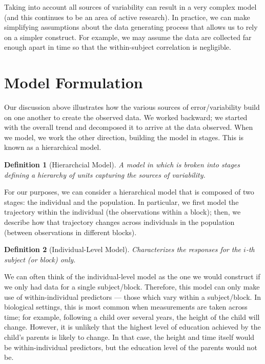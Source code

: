 \documentclass[
]{book}
\theoremstyle{plain}
\theoremstyle{mydefn}
\newtheorem{definition}{Definition}[chapter]
\theoremstyle{myexmpl}
\theoremstyle{remark}
\begin{document}
Taking into account all sources of variability can result in a very complex model (and this continues to be an area of active research). In practice, we can make simplifying assumptions about the data generating process that allows us to rely on a simpler construct. For example, we may assume the data are collected far enough apart in time so that the within-subject correlation is negligible.

\hypertarget{model-formulation}{%
\section{Model Formulation}\label{model-formulation}}

Our discussion above illustrates how the various sources of error/variability build on one another to create the observed data. We worked backward; we started with the overall trend and decomposed it to arrive at the data observed. When we model, we work the other direction, building the model in stages. This is known as a hierarchical model.

\begin{definition}[Hierarchcial Model]
A model in which is broken into stages defining a hierarchy of units capturing the sources of variability.
\end{definition}

For our purposes, we can consider a hierarchical model that is composed of two stages: the individual and the population. In particular, we first model the trajectory within the individual (the observations within a block); then, we describe how that trajectory changes across individuals in the population (between observations in different blocks).

\begin{definition}[Individual-Level Model]
Characterizes the responses for the \(i\)-th subject (or block) only.
\end{definition}

We can often think of the individual-level model as the one we would construct if we only had data for a single subject/block. Therefore, this model can only make use of within-individual predictors --- those which vary within a subject/block. In biological settings, this is most common when measurements are taken across time; for example, following a child over several years, the height of the child will change. However, it is unlikely that the highest level of education achieved by the child's parents is likely to change. In that case, the height and time itself would be within-individual predictors, but the education level of the parents would not be.
\end{document}

